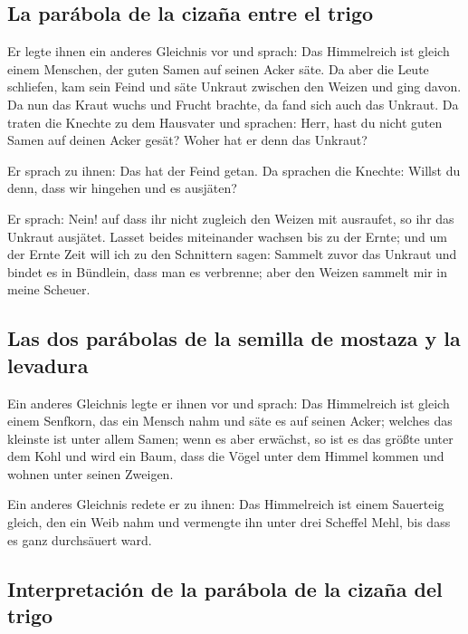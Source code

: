 \hypertarget{la-paruxe1bola-de-la-cizauxf1a-entre-el-trigo}{%
\subsection{La parábola de la cizaña entre el
trigo}\label{la-paruxe1bola-de-la-cizauxf1a-entre-el-trigo}}

 Er legte ihnen ein anderes Gleichnis vor und sprach: Das
Himmelreich ist gleich einem Menschen, der guten Samen auf seinen Acker
säte.  Da aber die Leute schliefen, kam sein Feind und
säte Unkraut zwischen den Weizen und ging davon.  Da nun
das Kraut wuchs und Frucht brachte, da fand sich auch das Unkraut.
 Da traten die Knechte zu dem Hausvater und sprachen:
Herr, hast du nicht guten Samen auf deinen Acker gesät? Woher hat er
denn das Unkraut?

 Er sprach zu ihnen: Das hat der Feind getan. Da sprachen
die Knechte: Willst du denn, dass wir hingehen und es ausjäten?

 Er sprach: Nein! auf dass ihr nicht zugleich den Weizen
mit ausraufet, so ihr das Unkraut ausjätet.  Lasset
beides miteinander wachsen bis zu der Ernte; und um der Ernte Zeit will
ich zu den Schnittern sagen: Sammelt zuvor das Unkraut und bindet es in
Bündlein, dass man es verbrenne; aber den Weizen sammelt mir in meine
Scheuer.

\hypertarget{las-dos-paruxe1bolas-de-la-semilla-de-mostaza-y-la-levadura}{%
\subsection{Las dos parábolas de la semilla de mostaza y la
levadura}\label{las-dos-paruxe1bolas-de-la-semilla-de-mostaza-y-la-levadura}}

 Ein anderes Gleichnis legte er ihnen vor und sprach: Das
Himmelreich ist gleich einem Senfkorn, das ein Mensch nahm und säte es
auf seinen Acker;  welches das kleinste ist unter allem
Samen; wenn es aber erwächst, so ist es das größte unter dem Kohl und
wird ein Baum, dass die Vögel unter dem Himmel kommen und wohnen unter
seinen Zweigen.

 Ein anderes Gleichnis redete er zu ihnen: Das
Himmelreich ist einem Sauerteig gleich, den ein Weib nahm und vermengte
ihn unter drei Scheffel Mehl, bis dass es ganz durchsäuert ward.

\hypertarget{interpretaciuxf3n-de-la-paruxe1bola-de-la-cizauxf1a-del-trigo}{%
\subsection{Interpretación de la parábola de la cizaña del
trigo}\label{interpretaciuxf3n-de-la-paruxe1bola-de-la-cizauxf1a-del-trigo}}

